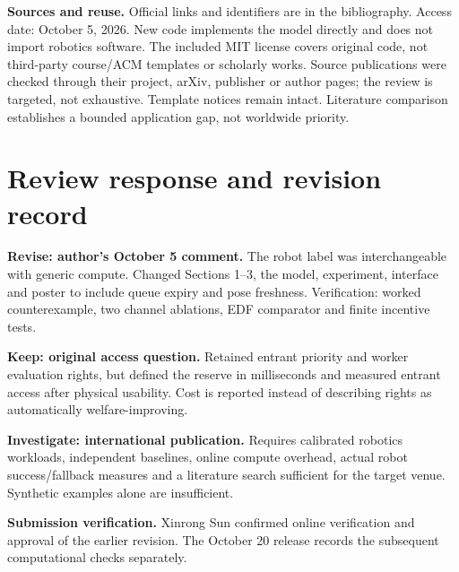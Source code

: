 \textbf{Sources and reuse.} Official links and identifiers are in the bibliography. Access date: October 5, 2026. New code implements the model directly and does not import robotics software. The included MIT license covers original code, not third-party course/ACM templates or scholarly works. Source publications were checked through their project, arXiv, publisher or author pages; the review is targeted, not exhaustive. Template notices remain intact. Literature comparison establishes a bounded application gap, not worldwide priority.

\section{Review response and revision record}

\textbf{Revise: author's October 5 comment.} The robot label was interchangeable with generic compute. Changed Sections 1--3, the model, experiment, interface and poster to include queue expiry and pose freshness. Verification: worked counterexample, two channel ablations, EDF comparator and finite incentive tests.

\textbf{Keep: original access question.} Retained entrant priority and worker evaluation rights, but defined the reserve in milliseconds and measured entrant access after physical usability. Cost is reported instead of describing rights as automatically welfare-improving.

\textbf{Investigate: international publication.} Requires calibrated robotics workloads, independent baselines, online compute overhead, actual robot success/fallback measures and a literature search sufficient for the target venue. Synthetic examples alone are insufficient.

\textbf{Submission verification.} Xinrong Sun confirmed online verification and approval of the earlier revision. The October 20 release records the subsequent computational checks separately.

\clearpage\onecolumn
